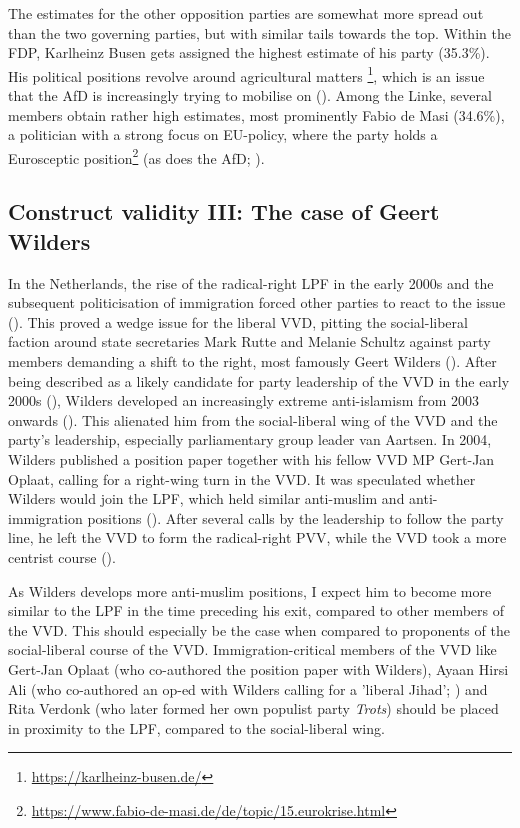 \documentclass{article}
\begin{document}
The estimates for the other opposition parties are somewhat more spread out than the two governing parties, but with similar tails towards the top. Within the FDP, Karlheinz Busen gets assigned the highest estimate of his party (35.3\%). His political positions revolve around agricultural matters \footnote{\url{https://karlheinz-busen.de/}}, which is an issue that the AfD is increasingly trying to mobilise on (\cite{Sueddeutsche2020AfD}).  Among the Linke, several members obtain rather high estimates, most prominently Fabio de Masi (34.6\%), a politician with a strong focus on EU-policy, where the party holds a Eurosceptic position\footnote{\url{https://www.fabio-de-masi.de/de/topic/15.eurokrise.html}} (as does the AfD; \cite{ThePopulist2019}).\par


\subsection{Construct validity III: The case of Geert Wilders}

In the Netherlands, the rise of the radical-right LPF in the early 2000s and the subsequent politicisation of immigration forced other parties to react to the issue (\cite{DeVries2012c, Pennings2003}). This proved a wedge issue for the liberal VVD, pitting the social-liberal faction around state secretaries Mark Rutte and Melanie Schultz against party members demanding a shift to the right, most famously Geert Wilders (\cite{VandeWardt2014, Vossen2011}). After being described as a likely candidate for party leadership of the VVD in the early 2000s (\cite[182]{Vossen2011}), Wilders developed an increasingly extreme anti-islamism from 2003 onwards (\cite[26]{Vossen2010}). This alienated him from the social-liberal wing of the VVD and the party's leadership, especially parliamentary group leader van Aartsen. In 2004, Wilders published a position paper together with his fellow VVD MP Gert-Jan Oplaat, calling for a right-wing turn in the VVD. It was speculated whether Wilders would join the LPF, which held similar anti-muslim and anti-immigration positions (\cite{Parool2004Wilders, Handelsblad2008Wilders}). After several calls by the leadership to follow the party line, he left the VVD to form the radical-right PVV, while the VVD took a more centrist course (\cite{Vossen2010, Vossen2011}). \par

As Wilders develops more anti-muslim positions, I expect him to become more similar to the LPF in the time preceding his exit, compared to other members of the VVD. This should especially be the case when compared to proponents of the social-liberal course of the VVD. Immigration-critical members of the VVD like Gert-Jan Oplaat (who co-authored the position paper with Wilders), Ayaan Hirsi Ali (who co-authored an op-ed with Wilders calling for a 'liberal Jihad'; \cite[183]{Vossen2011}) and Rita Verdonk (who later formed her own populist party \textit{Trots}) should be placed in proximity to the LPF, compared to the social-liberal wing. \par
\end{document}
